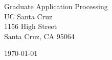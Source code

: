 \begin{minipage}{0.49\textwidth}
\begin{flushleft}
\noindent 
Graduate Application Processing\\
UC Santa Cruz\\
1156 High Street\\
Santa Cruz, CA 95064 
\end{flushleft}
\end{minipage}
\begin{minipage}{0.47\textwidth}
\begin{flushright}
\today
\end{flushright}
\end{minipage} \\

\newcommand{\univ}{University of California, Santa Cruz}
\newcommand{\univshort}{UCSC}
\newcommand{\degree}{M.Sc.}
\newcommand{\dept}{Computer Science}
